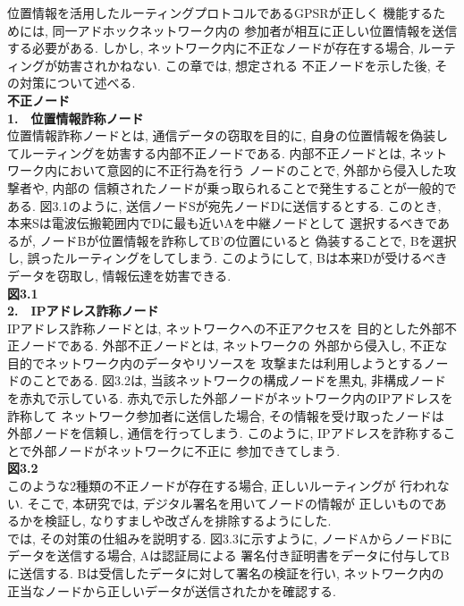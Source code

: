 位置情報を活用したルーティングプロトコルであるGPSRが正しく
機能するためには, 同一アドホックネットワーク内の
参加者が相互に正しい位置情報を送信する必要がある. 
しかし, ネットワーク内に不正なノードが存在する場合, 
ルーティングが妨害されかねない. この章では, 想定される 
不正ノードを示した後, その対策について述べる. \\

{\large\textbf{不正ノード}}\\
\noindent \textbf{1.　位置情報詐称ノード}\\
\indent 位置情報詐称ノードとは, 通信データの窃取を目的に, 
自身の位置情報を偽装してルーティングを妨害する内部不正ノードである. 
内部不正ノードとは, ネットワーク内において意図的に不正行為を行う
ノードのことで, 外部から侵入した攻撃者や, 内部の
信頼されたノードが乗っ取られることで発生することが一般的である. 
図3.1のように, 送信ノードSが宛先ノードDに送信するとする. 
このとき, 本来Sは電波伝搬範囲内でDに最も近いAを中継ノードとして
選択するべきであるが, ノードBが位置情報を詐称してB'の位置にいると
偽装することで, Bを選択し, 誤ったルーティングをしてしまう. 
このようにして, Bは本来Dが受けるべきデータを窃取し, 
情報伝達を妨害できる.\\ 

{\Large\textbf{図3.1}}\\

\noindent \textbf{2.　IPアドレス詐称ノード}\\
\indent IPアドレス詐称ノードとは, ネットワークへの不正アクセスを
目的とした外部不正ノードである. 外部不正ノードとは, ネットワークの
外部から侵入し, 不正な目的でネットワーク内のデータやリソースを
攻撃または利用しようとするノードのことである. 図3.2は,  
当該ネットワークの構成ノードを黒丸, 非構成ノードを赤丸で示している. 
赤丸で示した外部ノードがネットワーク内のIPアドレスを詐称して
ネットワーク参加者に送信した場合, その情報を受け取ったノードは
外部ノードを信頼し, 通信を行ってしまう. このように, 
IPアドレスを詐称することで外部ノードがネットワークに不正に
参加できてしまう. \\

{\Large\textbf{図3.2}}\\

\indent このような2種類の不正ノードが存在する場合, 正しいルーティングが
行われない. そこで, 本研究では, デジタル署名を用いてノードの情報が
正しいものであるかを検証し, なりすましや改ざんを排除するようにした. \\
\indent では, その対策の仕組みを説明する. 図3.3に示すように, 
ノードAからノードBにデータを送信する場合, Aは認証局による
署名付き証明書をデータに付与してBに送信する. 
Bは受信したデータに対して署名の検証を行い, ネットワーク内の
正当なノードから正しいデータが送信されたかを確認する. \\

